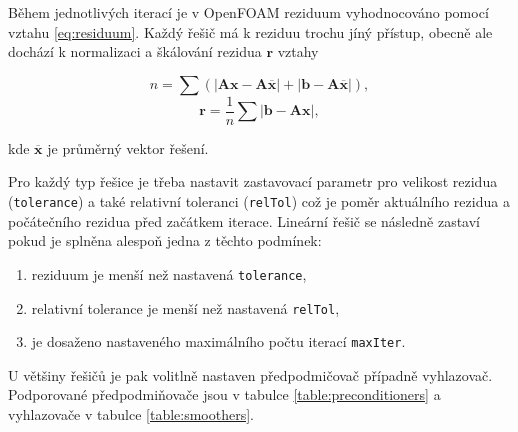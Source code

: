 \documentclass[a4paper,12pt]{report}
\theoremstyle{remark}
\begin{document}
Během jednotlivých iterací je v OpenFOAM reziduum vyhodnocováno pomocí vztahu \eqref{eq:residuum}. Každý řešič má k reziduu trochu jíný přístup, obecně ale dochází k normalizaci a škálování rezidua $\boldsymbol{r}$ vztahy

$$n = \sum \left( | \boldsymbol{A} \boldsymbol{x} - \boldsymbol{A} \overline{\boldsymbol{x}} | + | \boldsymbol{b} - \boldsymbol{A} \overline{\boldsymbol{x}} | \right),$$
$$\boldsymbol{r} = \frac{1}{n} \sum | \boldsymbol{b} - \boldsymbol{A} \boldsymbol{x} |,$$

kde $\overline{\boldsymbol{x}}$ je průměrný vektor řešení.  

Pro každý typ řešice je třeba nastavit zastavovací parametr pro velikost rezidua (\texttt{tolerance}) a také relativní toleranci (\texttt{relTol}) což je poměr aktuálního rezidua a počátečního rezidua před začátkem iterace. Lineární řešič se následně zastaví pokud je splněna alespoň jedna z těchto podmínek:
\begin{enumerate}
	\item reziduum je menší než nastavená \texttt{tolerance},
	\item relativní tolerance je menší než nastavená \texttt{relTol},
	\item je dosaženo nastaveného maximálního počtu iterací \texttt{maxIter}.
\end{enumerate}




U většiny řešičů je pak volitlně nastaven předpodmičovač případně vyhlazovač. Podporované předpodmiňovače jsou v tabulce \ref{table:preconditioners} a vyhlazovače v tabulce \ref{table:smoothers}.
\end{document}

